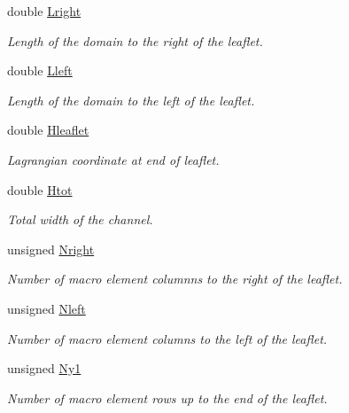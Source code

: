\begin{DoxyCompactItemize}
\item 
double \hyperlink{classoomph_1_1ChannelWithLeafletDomain_a6c1a799bbedc5f0ff08f38088eaedc68}{Lright}
\begin{DoxyCompactList}\small\item\em Length of the domain to the right of the leaflet. \end{DoxyCompactList}\item 
double \hyperlink{classoomph_1_1ChannelWithLeafletDomain_a0a50a8a7b274fb1dfc6d18c79ca884cd}{Lleft}
\begin{DoxyCompactList}\small\item\em Length of the domain to the left of the leaflet. \end{DoxyCompactList}\item 
double \hyperlink{classoomph_1_1ChannelWithLeafletDomain_a75ce3248efae5c33a9c9989b2f310139}{Hleaflet}
\begin{DoxyCompactList}\small\item\em Lagrangian coordinate at end of leaflet. \end{DoxyCompactList}\item 
double \hyperlink{classoomph_1_1ChannelWithLeafletDomain_ad32b0daa71b42d34aec81c7e3d25cb98}{Htot}
\begin{DoxyCompactList}\small\item\em Total width of the channel. \end{DoxyCompactList}\item 
unsigned \hyperlink{classoomph_1_1ChannelWithLeafletDomain_a11aac62965f9bcb7d4c0043669b28f15}{Nright}
\begin{DoxyCompactList}\small\item\em Number of macro element columnns to the right of the leaflet. \end{DoxyCompactList}\item 
unsigned \hyperlink{classoomph_1_1ChannelWithLeafletDomain_ad0abd8837f9f0924b801d2fb78c69532}{Nleft}
\begin{DoxyCompactList}\small\item\em Number of macro element columns to the left of the leaflet. \end{DoxyCompactList}\item 
unsigned \hyperlink{classoomph_1_1ChannelWithLeafletDomain_a3c6393ef6e626d7a2f2a8ea70c8addbe}{Ny1}
\begin{DoxyCompactList}\small\item\em Number of macro element rows up to the end of the leaflet. \end{DoxyCompactList}\item 

\end{DoxyCompactItemize}
